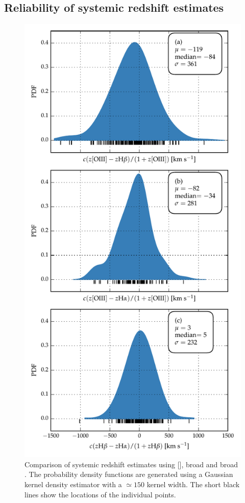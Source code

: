 \subsection{Reliability of systemic redshift estimates}
\label{sec:ch4_redshifts}

\begin{figure}
    \centering
    \includegraphics[width=0.8\linewidth]{figures/chapter04/redshift_comparison.pdf} 
    \caption[{Comparison of systemic redshift estimates using [], broad \hb and broad \hans.}]{Comparison of systemic redshift estimates using [], broad \hb and broad \hans. The probability density functions are generated using a Gaussian kernel density estimator with a $\simeq150$ \kms kernel width. The short black lines show the locations of the individual points.}       
    \label{fig:redshift_comparison}
\end{figure}

